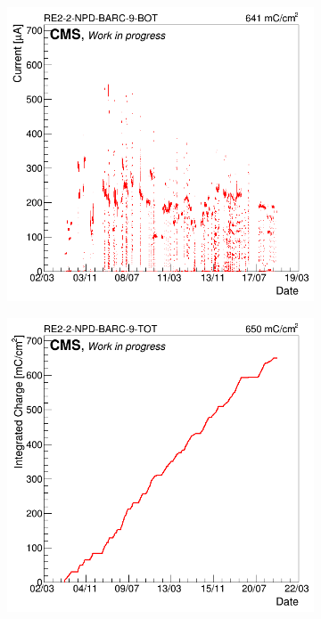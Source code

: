 \begin{figure}[H]
\begin{subfigure}{0.5\linewidth}
        	\caption{\label{fig:Longevity:B}}
    	\end{subfigure}
    	\begin{subfigure}{0.5\linewidth}
			\centering
    		\includegraphics[width = \linewidth]{fig/chapt5/GIFpp-Longevity-monitoring-BOT.png}
        	\caption{\label{fig:Longevity:C}}
    	\end{subfigure}
    	\begin{subfigure}{0.5\linewidth}
			\centering
    		\includegraphics[width = \linewidth]{fig/chapt5/GIFpp-Longevity-int-charge.png}

\end{subfigure}
\end{figure}
